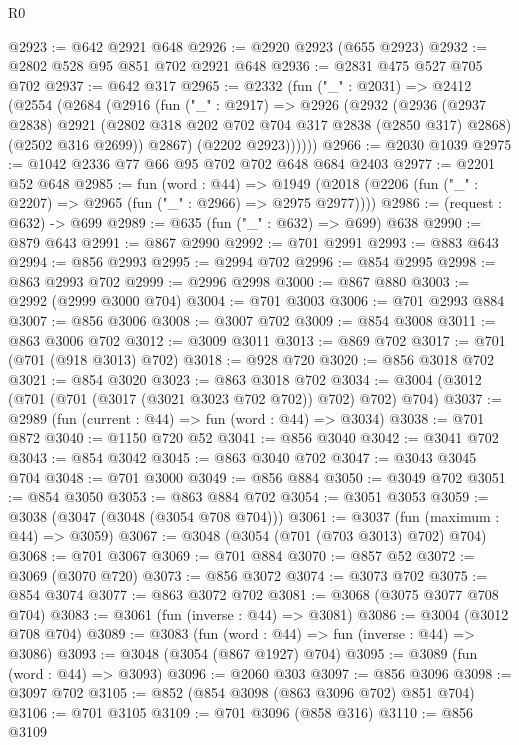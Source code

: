 \begin{lexlean}{R0}
\begin{coremodule}
@2923 := @642 @2921 @648
@2926 := @2920 @2923 (@655 @2923)
@2932 := @2802 @528 @95 @851 @702 @2921 @648
@2936 := @2831 @475 @527 @705 @702
@2937 := @642 @317
@2965 := @2332
    (fun ("_" : @2031) =>
    @2412
      (@2554
        (@2684
          (@2916
            (fun ("_" : @2917) =>
            @2926
              (@2932
                (@2936
                  (@2937 @2838)
                  @2921
                  (@2802 @318 @202 @702 @704 @317 @2838 (@2850 @317) @2868)
                  (@2502 @316 @2699))
                @2867)
              (@2202 @2923))))))
@2966 := @2030 @1039
@2975 := @1042 @2336 @77 @66 @95 @702 @702 @648 @684 @2403
@2977 := @2201 @52 @648
@2985 := fun (word : @44) =>
  @1949 (@2018 (@2206 (fun ("_" : @2207) => @2965 (fun ("_" : @2966) => @2975 @2977))))
@2986 := (request : @632) -> @699
@2989 := @635 (fun ("_" : @632) => @699) @638
@2990 := @879 @643
@2991 := @867 @2990
@2992 := @701 @2991
@2993 := @883 @643
@2994 := @856 @2993
@2995 := @2994 @702
@2996 := @854 @2995
@2998 := @863 @2993 @702
@2999 := @2996 @2998
@3000 := @867 @880
@3003 := @2992 (@2999 @3000 @704)
@3004 := @701 @3003
@3006 := @701 @2993 @884
@3007 := @856 @3006
@3008 := @3007 @702
@3009 := @854 @3008
@3011 := @863 @3006 @702
@3012 := @3009 @3011
@3013 := @869 @702
@3017 := @701 (@701 (@918 @3013) @702)
@3018 := @928 @720
@3020 := @856 @3018 @702
@3021 := @854 @3020
@3023 := @863 @3018 @702
@3034 := @3004 (@3012 (@701 (@701 (@3017 (@3021 @3023 @702 @702)) @702) @702) @704)
@3037 := @2989 (fun (current : @44) => fun (word : @44) => @3034)
@3038 := @701 @872
@3040 := @1150 @720 @52
@3041 := @856 @3040
@3042 := @3041 @702
@3043 := @854 @3042
@3045 := @863 @3040 @702
@3047 := @3043 @3045 @704
@3048 := @701 @3000
@3049 := @856 @884
@3050 := @3049 @702
@3051 := @854 @3050
@3053 := @863 @884 @702
@3054 := @3051 @3053
@3059 := @3038 (@3047 (@3048 (@3054 @708 @704)))
@3061 := @3037 (fun (maximum : @44) => @3059)
@3067 := @3048 (@3054 (@701 (@703 @3013) @702) @704)
@3068 := @701 @3067
@3069 := @701 @884
@3070 := @857 @52
@3072 := @3069 (@3070 @720)
@3073 := @856 @3072
@3074 := @3073 @702
@3075 := @854 @3074
@3077 := @863 @3072 @702
@3081 := @3068 (@3075 @3077 @708 @704)
@3083 := @3061 (fun (inverse : @44) => @3081)
@3086 := @3004 (@3012 @708 @704)
@3089 := @3083 (fun (word : @44) => fun (inverse : @44) => @3086)
@3093 := @3048 (@3054 (@867 @1927) @704)
@3095 := @3089 (fun (word : @44) => @3093)
@3096 := @2060 @303
@3097 := @856 @3096
@3098 := @3097 @702
@3105 := @852 (@854 @3098 (@863 @3096 @702) @851 @704)
@3106 := @701 @3105
@3109 := @701 @3096 (@858 @316)
@3110 := @856 @3109

\end{coremodule}
\end{lexlean}
